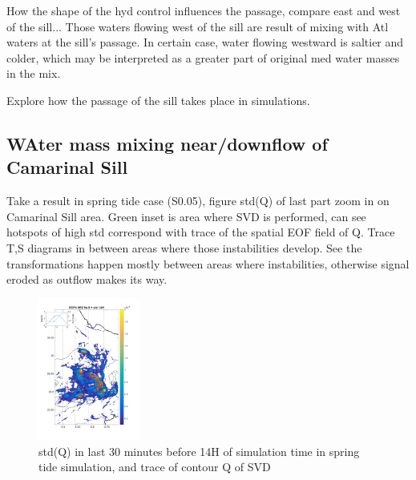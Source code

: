 How the shape of the hyd control influences the passage, compare east and west of the sill... 
Those waters flowing west of the sill are result of mixing with Atl waters at the sill's passage.
In certain case, water flowing westward is saltier and colder, which may be interpreted as a greater part of original med water masses in the mix.


Explore how the passage of the sill takes place in simulations.










\subsection{WAter mass mixing near/downflow of Camarinal Sill}

Take a result in spring tide case (S0.05), figure std(Q) of last part zoom in on Camarinal Sill area. Green inset is area where SVD is performed, can see hotspots of high std correspond with trace of the spatial EOF field of Q. Trace T,S diagrams in between areas where those instabilities develop. See the transformations happen mostly between areas where instabilities, otherwise signal eroded as outflow makes its way.

\begin{figure}[!h]
 \includegraphics[width=0.3\textwidth]{./GBR3D/EOF_std_14hCso_traces.png}
 \caption {std(Q) in last 30 minutes before 14H of simulation time in spring tide simulation, and trace of contour Q of SVD}
\end{figure}


